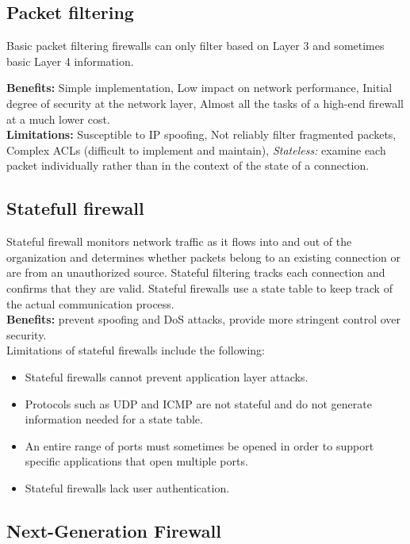 \subsection{Packet filtering}

Basic packet filtering firewalls can only filter based on Layer 3 and sometimes basic Layer 4 information. 

\textbf{Benefits:} Simple implementation, Low impact on network performance, Initial degree of security at the network layer, Almost all the tasks of a high-end firewall at a much lower cost.\\

\textbf{Limitations:} Susceptible to IP spoofing, Not reliably filter fragmented packets, Complex ACLs (difficult to implement and maintain), \emph{Stateless:} examine each packet individually rather than in the context of the state of a connection.

\subsection{Statefull firewall}

Stateful firewall monitors network traffic as it flows into and out of the organization and determines whether packets belong to an existing connection or are from an unauthorized source. Stateful filtering tracks each connection and confirms that they are valid. Stateful firewalls use a state table to keep track of the actual communication process.\\ 

\textbf{Benefits:} prevent spoofing and DoS attacks, provide more stringent control over security.\\ 

Limitations of stateful firewalls include the following:

\begin{itemize}
\item Stateful firewalls cannot prevent application layer attacks.
\item Protocols such as UDP and ICMP are not stateful and do not generate information needed for a state table.
\item An entire range of ports must sometimes be opened in order to support specific applications that open multiple ports.
\item Stateful firewalls lack user authentication.
\end{itemize}

\subsection{Next-Generation Firewall}

